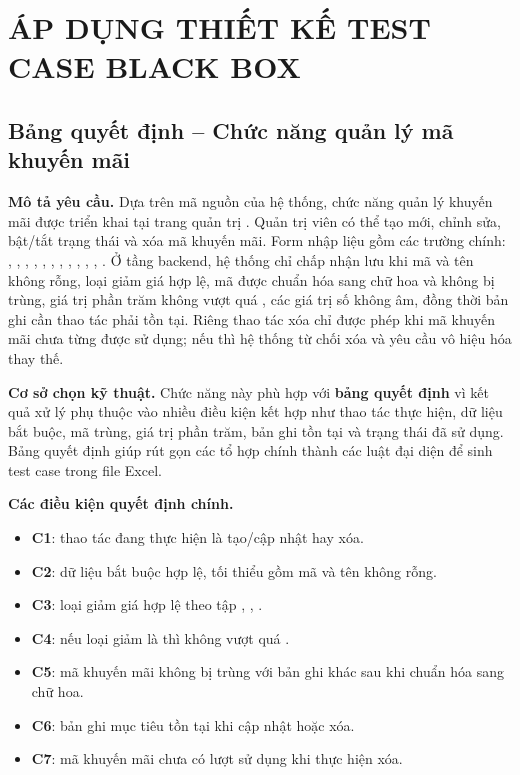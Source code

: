 \newpage
\section{\textbf{ÁP DỤNG THIẾT KẾ TEST CASE BLACK BOX}}

\subsection{Bảng quyết định -- Chức năng quản lý mã khuyến mãi}
\textbf{Mô tả yêu cầu.} Dựa trên mã nguồn của hệ thống, chức năng quản lý khuyến mãi được triển khai tại trang quản trị . Quản trị viên có thể tạo mới, chỉnh sửa, bật/tắt trạng thái và xóa mã khuyến mãi. Form nhập liệu gồm các trường chính: , , , , , , , , , , , . Ở tầng backend, hệ thống chỉ chấp nhận lưu khi mã và tên không rỗng, loại giảm giá hợp lệ, mã được chuẩn hóa sang chữ hoa và không bị trùng, giá trị phần trăm không vượt quá , các giá trị số không âm, đồng thời bản ghi cần thao tác phải tồn tại. Riêng thao tác xóa chỉ được phép khi mã khuyến mãi chưa từng được sử dụng; nếu  thì hệ thống từ chối xóa và yêu cầu vô hiệu hóa thay thế.

\textbf{Cơ sở chọn kỹ thuật.} Chức năng này phù hợp với \textbf{bảng quyết định} vì kết quả xử lý phụ thuộc vào nhiều điều kiện kết hợp như thao tác thực hiện, dữ liệu bắt buộc, mã trùng, giá trị phần trăm, bản ghi tồn tại và trạng thái đã sử dụng. Bảng quyết định giúp rút gọn các tổ hợp chính thành các luật đại diện để sinh test case trong file Excel.

\textbf{Các điều kiện quyết định chính.}
\begin{itemize}
	\item \textbf{C1}: thao tác đang thực hiện là tạo/cập nhật hay xóa.
	\item \textbf{C2}: dữ liệu bắt buộc hợp lệ, tối thiểu gồm mã và tên không rỗng.
	\item \textbf{C3}: loại giảm giá hợp lệ theo tập , , .
	\item \textbf{C4}: nếu loại giảm là  thì  không vượt quá .
	\item \textbf{C5}: mã khuyến mãi không bị trùng với bản ghi khác sau khi chuẩn hóa sang chữ hoa.
	\item \textbf{C6}: bản ghi mục tiêu tồn tại khi cập nhật hoặc xóa.
	\item \textbf{C7}: mã khuyến mãi chưa có lượt sử dụng khi thực hiện xóa.
\end{itemize}

